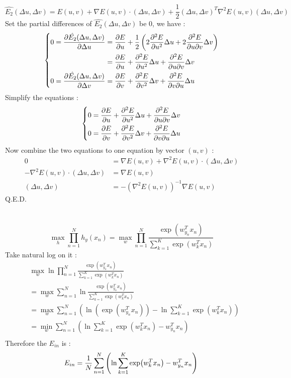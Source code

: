 \documentclass[12pt,a4paper]{article}
\begin{document}
\section{} %
\[
	\hat{{E}_2}(\Delta u,\Delta v)
		= E(u, v) + \nabla E(u, v) \cdot (\Delta u, \Delta v)
		+ \frac{1}{2} {(\Delta u, \Delta v)}^{T} {\nabla}^{2}E(u, v) (\Delta u, \Delta v)
\]
Set the partial differences of $\hat{{E}_2}(\Delta u,\Delta v)$ be $0$, we have :
\[
	\left\{
		\begin{aligned}
			0 = \pdv{\hat{{E}_2}(\Delta u,\Delta v)}{\Delta u}
				&= \pdv{E}{u} + \frac{1}{2}\left( 2 \pdv[2]{E}{u} \Delta u + 2 \pdv{E}{u}{v} \Delta v \right) \\
				&= \pdv{E}{u} + \pdv[2]{E}{u} \Delta u + \pdv{E}{u}{v} \Delta v \\
			0 = \pdv{\hat{{E}_2}(\Delta u,\Delta v)}{\Delta v}
				&= \pdv{E}{v} + \pdv[2]{E}{v} \Delta v + \pdv{E}{v}{u} \Delta u \\
		\end{aligned}
	\right.
\]
Simplify the equations :
\[
	\left\{
		\begin{aligned}
			0 &= \pdv{E}{u} + \pdv[2]{E}{u} \Delta u + \pdv{E}{u}{v} \Delta v \\
			0 &= \pdv{E}{v} + \pdv[2]{E}{v} \Delta v + \pdv{E}{v}{u} \Delta u \\
		\end{aligned}
	\right.
\]
Now combine the two equations to one equation by vector $(u, v)$ :
\[
	\begin{aligned}
		0 &= \nabla E(u, v) + {\nabla}^{2} E(u, v) \cdot (\Delta u, \Delta v) \\
		- {\nabla}^{2} E(u, v) \cdot (\Delta u, \Delta v) &= \nabla E(u, v) \\
		(\Delta u, \Delta v) &= - {\left({\nabla}^{2} E(u, v)\right)}^{-1} \nabla E(u, v)
	\end{aligned}
\]
Q.E.D.
\section{} %
\[
		\max_{h} \prod_{n=1}^{N} h_{y}\left(x_{n}\right) 
		= \max_{w} \prod_{n=1}^{N}
			\frac{\exp({w}_{y_{n}}^{T}x_{n})}{\sum_{k=1}^{K} \exp({w}_{k}^{T}x_{n})}
\]
Take natural log on it :
\[
	\begin{aligned}
		& \max_{w} \ln \prod_{n=1}^{N}
			\frac{\exp({w}_{y_{n}}^{T}x_{n})}{\sum_{k=1}^{K} \exp({w}_{k}^{T}x_{n})} \\
		&= \max_{w} \sum_{n=1}^{N} \ln
			\frac{\exp({w}_{y_{n}}^{T}x_{n})}{\sum_{k=1}^{K} \exp({w}_{k}^{T}x_{n})} \\
		&= \max_{w} \sum_{n=1}^{N} \left( \ln( \exp({w}_{y_{n}}^{T}x_{n}) ) -
			\ln\sum_{k=1}^{K} \exp({w}_{k}^{T}x_{n}) \right) \\
		&= \min_{w} \sum_{n=1}^{N} \left( \ln\sum_{k=1}^{K} \exp({w}_{k}^{T}x_{n}) -
			{w}_{y_{n}}^{T}x_{n} \right) \\
	\end{aligned}
\]
Therefore the $E_{in}$ is :
\[
	E_{in} = \frac{1}{N} \sum_{n=1}^{N} \left( \ln \sum_{k=1}^{K} \exp({w}_{k}^{T}x_{n}) -
		{w}_{y_{n}}^{T}x_{n} \right) \\
\]
\end{document}

